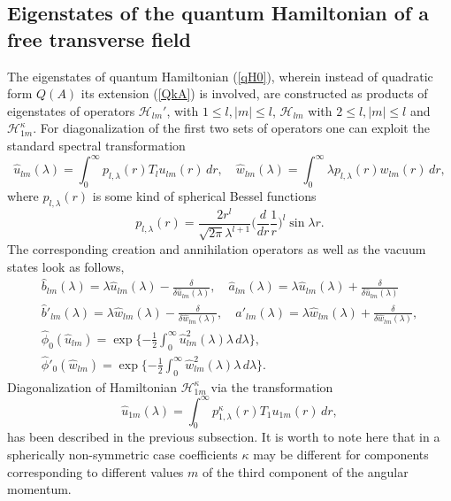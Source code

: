 \documentclass[12pt]{article}
\newcommand{\HH}{\mathscr{H}}
\begin{document}
\subsection{Eigenstates of the quantum Hamiltonian of a free transverse field}
	The eigenstates of quantum Hamiltonian
(\ref{qH0}),
	wherein instead of quadratic form
$ Q(A) $
	its extension 
(\ref{QkA}) is involved,
	are constructed as products of eigenstates of operators
$ \HH_{lm}' $, with
$ 1\leq l, |m| \leq l $,
$ \HH_{lm} $ with
$ 2\leq l, |m| \leq l $ and
$ \HH_{1m}^{\kappa} $.
	For diagonalization of the first two sets of operators one can exploit
	the standard spectral transformation
\begin{equation*}
    \hat{u}_{lm}(\lambda)
	= \int_{0}^{\infty} p_{l,\lambda}(r) T_{l} u_{lm}(r)\,dr ,
    \quad \hat{w}_{lm}(\lambda)
	= \int_{0}^{\infty} \lambda p_{l,\lambda}(r) w_{lm}(r)\,dr ,
\end{equation*}
	where
$ p_{l,\lambda}(r) $
	is some kind of spherical Bessel functions
\begin{equation*}
    p_{l,\lambda}(r) = \frac{2r^{l}}{\sqrt{2\pi}\lambda^{l+1}}
	\bigl(\frac{d}{dr}\frac{1}{r}\bigr)^{l} \sin \lambda r .
\end{equation*}
	The corresponding creation and annihilation operators as well as the
	vacuum states look as follows,
\begin{gather*}
    \hat{b}_{lm}(\lambda) = \lambda \hat{u}_{lm}(\lambda)
	- \frac{\delta}{\delta \hat{u}_{lm}(\lambda)} ,\quad
    \hat{a}_{lm}(\lambda) = \lambda \hat{u}_{lm}(\lambda) 
	+ \frac{\delta}{\delta \hat{u}_{lm}(\lambda)} \\
    \hat{b}'_{lm}(\lambda) = \lambda \hat{w}_{lm}(\lambda)
	- \frac{\delta}{\delta \hat{w}_{lm}(\lambda)} ,\quad
    \hat{a}'_{lm}(\lambda) = \lambda \hat{w}_{lm}(\lambda) 
	+ \frac{\delta}{\delta \hat{w}_{lm}(\lambda)} ,\\
    \hat{\phi}_{0}(\hat{u}_{lm}) = \exp\{-\frac{1}{2}
	\int_{0}^{\infty} \hat{u}_{lm}^{2}(\lambda) \lambda \,d\lambda \} ,\\
    \hat{\phi}'_{0}(\hat{w}_{lm}) = \exp\{-\frac{1}{2}
	\int_{0}^{\infty} \hat{w}_{lm}^{2}(\lambda) \lambda \,d\lambda \} .
\end{gather*}
	Diagonalization of Hamiltonian
$ \HH_{1m}^{\kappa} $
	via the transformation
\begin{equation*}
    \hat{u}_{1m}(\lambda) = \int_{0}^{\infty} p_{1,\lambda}^{\kappa}(r)
	T_{1} u_{1m}(r)\,dr, 
\end{equation*}
	has been described in the previous subsection.
	It is worth to note here that in a spherically non-symmetric case
	coefficients
$ \kappa $
	may be different for components corresponding to different values
$ m $
	of the third component of the angular momentum.
\end{document}
